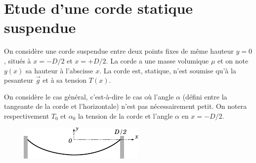 \documentclass{report}
\begin{document}
\section*{Etude d'une corde statique suspendue}

On considère une corde suspendue entre deux points fixes de même hauteur $y=0$, situés à $x=-D/2$ et $x=+D/2$. La corde a une masse volumique $\mu$ et on note $y(x)$ sa hauteur à l'abscisse $x$. La corde est, statique, n'est soumise qu'à la pesanteur $\vec{g}$ et à sa tension $T(x)$. 

On considère le cas général, c'est-à-dire le cas où l'angle $\alpha$ (défini entre la tangeante de la corde et l'horizontale) n'est pas nécessairement petit. On notera respectivement $T_0$ et $\alpha_0$ la tension de la corde et l'angle $\alpha$ en $x=-D/2$.

\begin{figure}[h!]
\centering
		\includegraphics[scale=1.5]{onde1.pdf}
\end{figure}
\end{document}

